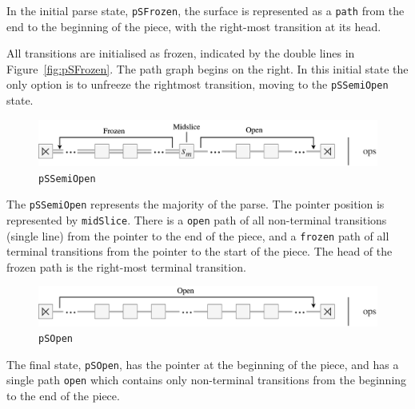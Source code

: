 \documentclass[12pt,a4paper,twoside,openright]{report}
\theoremstyle{definition}
\begin{document}
In the initial parse state, \texttt{pSFrozen}, the surface is represented as a \texttt{path} from the end to the beginning of the piece, with the right-most transition at its head.

All transitions are initialised as frozen, indicated by the double lines in Figure~\ref{fig:pSFrozen}. The path graph begins on the right. In this initial state the only option is to unfreeze the rightmost transition, moving to the \texttt{pSSemiOpen} state. 

\begin{figure}[h]
  \centering\includegraphics[width=\textwidth]{impl/parseState/semiopen.png}
  \caption{\texttt{pSSemiOpen}}
  \label{fig:pSSemiOpen}
\end{figure}

The \texttt{pSSemiOpen} represents the majority of the parse. The pointer position is represented by \texttt{midSlice}. There is a \texttt{open} path of all non-terminal transitions (single line) from the pointer to the end of the piece, and a \texttt{frozen} path of all terminal transitions from the pointer to the start of the piece. The head of the frozen path is the right-most terminal transition.

\begin{figure}[h]
  \centering\includegraphics[width=\textwidth]{impl/parseState/open.png}
  \caption{\texttt{pSOpen}}
  \label{fig:pSOpen}
\end{figure}

The final state, \texttt{pSOpen}, has the pointer at the beginning of the piece, and has a single path \texttt{open} which contains only non-terminal transitions from the beginning to the end of the piece.
\end{document}
